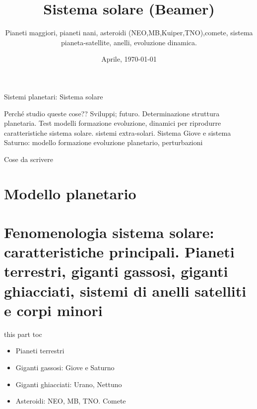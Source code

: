 \documentclass[10pt,xcolor={usenames},fleqn,mathserif,serif]{beamer}
\title{Sistema solare (Beamer)}
\subtitle{Pianeti maggiori, pianeti nani, asteroidi (NEO,MB,Kuiper,TNO),comete, sistema pianeta-satellite, anelli, evoluzione dinamica.}
\date{Aprile, \today}
\begin{document}



\begin{frame}
  \titlepage
\end{frame}


\begin{frame}[]{Sistemi planetari: Sistema solare}
\tableofcontents[onlyparts]
\end{frame}

\begin{wordonframe}{Perch\'e studio queste cose?? Sviluppi; futuro.}
Determinazione struttura planetaria.
Test modelli formazione evoluzione, dinamici per  riprodurre caratteristiche sistema solare. sistemi extra-solari.
Sistema Giove e sistema Saturno: modello formazione evoluzione planetario, perturbazioni
\end{wordonframe}

\begin{frame}{Cose da scrivere}
\end{frame}


\part{Modello planetario}



\part{Fenomenologia sistema solare: caratteristiche principali. Pianeti terrestri, giganti gassosi, giganti ghiacciati, sistemi di anelli satelliti e corpi minori}

\begin{frame}{this part toc}
\begin{itemize}
\item Pianeti terrestri
\item Giganti gassosi: Giove e Saturno
\item Giganti ghiacciati: Urano, Nettuno
\item Asteroidi: NEO, MB, TNO. Comete
\end{itemize}
\end{frame}
\end{document}
